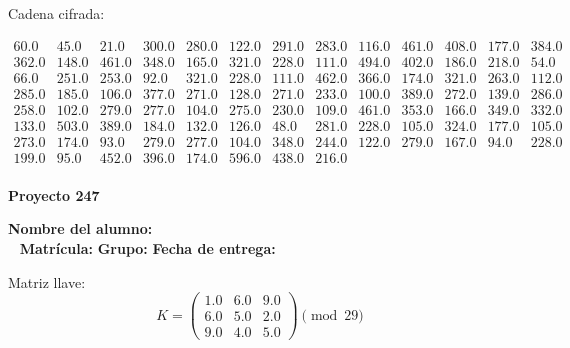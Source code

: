 \documentclass[12pt]{article}
\begin{document}
Cadena cifrada:
\begin{center}
$\begin{array}{lllllllllllll}
60.0 & 45.0 & 21.0 & 300.0 & 280.0 & 122.0 & 291.0 & 283.0 & 116.0 & 461.0 & 408.0 & 177.0 & 384.0\\
362.0 & 148.0 & 461.0 & 348.0 & 165.0 & 321.0 & 228.0 & 111.0 & 494.0 & 402.0 & 186.0 & 218.0 & 54.0\\
66.0 & 251.0 & 253.0 & 92.0 & 321.0 & 228.0 & 111.0 & 462.0 & 366.0 & 174.0 & 321.0 & 263.0 & 112.0\\
285.0 & 185.0 & 106.0 & 377.0 & 271.0 & 128.0 & 271.0 & 233.0 & 100.0 & 389.0 & 272.0 & 139.0 & 286.0\\
258.0 & 102.0 & 279.0 & 277.0 & 104.0 & 275.0 & 230.0 & 109.0 & 461.0 & 353.0 & 166.0 & 349.0 & 332.0\\
133.0 & 503.0 & 389.0 & 184.0 & 132.0 & 126.0 & 48.0 & 281.0 & 228.0 & 105.0 & 324.0 & 177.0 & 105.0\\
273.0 & 174.0 & 93.0 & 279.0 & 277.0 & 104.0 & 348.0 & 244.0 & 122.0 & 279.0 & 167.0 & 94.0 & 228.0\\
199.0 & 95.0 & 452.0 & 396.0 & 174.0 & 596.0 & 438.0 & 216.0\\
\end{array}$
\end{center}

\newpage


\textbf{Proyecto 247}

\textbf{Nombre del alumno:} \underline{\hspace{13cm}}\\\
\vspace{1cm}
\textbf{Matrícula:} \underline{\hspace{4cm}} \hspace{1cm}
\textbf{Grupo:} \underline{\hspace{2cm}}
\textbf{Fecha de entrega:} \underline{\hspace{2cm}}

\medskip

Matriz llave:
\[
K = \begin{pmatrix}
1.0 & 6.0 & 9.0\\
6.0 & 5.0 & 2.0\\
9.0 & 4.0 & 5.0
\end{pmatrix} \pmod{29}
\]
\end{document}
